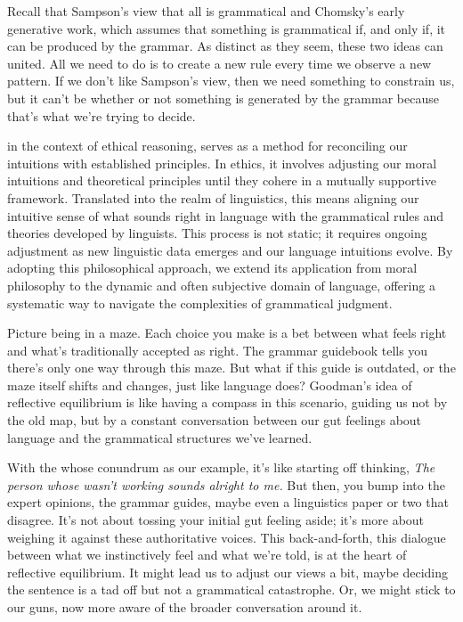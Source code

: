 \bigskip

Recall that Sampson's view that all is grammatical and Chomsky's early generative work, which assumes that something is grammatical if, and only if, it can be produced by the grammar. As distinct as they seem, these two ideas can united. All we need to do is to create a new rule every time we observe a new pattern. If we don't like Sampson's view, then we need something to constrain us, but it can't be whether or not something is generated by the grammar because that's what we're trying to decide.

in the context of ethical reasoning, serves as a method for reconciling our intuitions with established principles. In ethics, it involves adjusting our moral intuitions and theoretical principles until they cohere in a mutually supportive framework. Translated into the realm of linguistics, this means aligning our intuitive sense of what sounds right in language with the grammatical rules and theories developed by linguists. This process is not static; it requires ongoing adjustment as new linguistic data emerges and our language intuitions evolve. By adopting this philosophical approach, we extend its application from moral philosophy to the dynamic and often subjective domain of language, offering a systematic way to navigate the complexities of grammatical judgment.

Picture being in a maze. Each choice you make is a bet between what feels right and what's traditionally accepted as right. The grammar guidebook tells you there's only one way through this maze. But what if this guide is outdated, or the maze itself shifts and changes, just like language does? Goodman's idea of reflective equilibrium is like having a compass in this scenario, guiding us not by the old map, but by a constant conversation between our gut feelings about language and the grammatical structures we've learned.

With the whose conundrum as our example, it's like starting off thinking, \textit{The person whose wasn't working sounds alright to me.} But then, you bump into the expert opinions, the grammar guides, maybe even a linguistics paper or two that disagree. It's not about tossing your initial gut feeling aside; it's more about weighing it against these authoritative voices. This back-and-forth, this dialogue between what we instinctively feel and what we're told, is at the heart of reflective equilibrium. It might lead us to adjust our views a bit, maybe deciding the sentence is a tad off but not a grammatical catastrophe. Or, we might stick to our guns, now more aware of the broader conversation around it.

